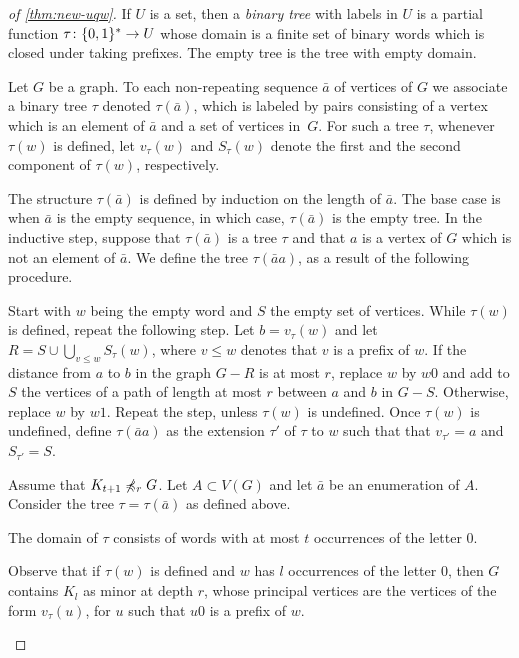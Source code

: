 \begin{proof}[of \cref{thm:new-uqw}]
  If $U$ is a set, then
  a \emph{binary tree}  with labels in $U$
  is a partial function  $\tau\colon \{0,1\}^*\to U$ whose domain is a finite set of binary words which is closed under taking prefixes.
The empty tree is the tree with empty domain.
  
  Let $G$ be a graph. To each non-repeating sequence $\bar a$ of vertices of $G$ we associate a binary tree $\tau$ denoted $\tau(\bar a)$, which is 
  labeled by pairs consisting 
  of a vertex which is an element of $\bar a$ and a set of vertices in~$G$. For such a tree $\tau$, 
  whenever $\tau(w)$ is defined,
   let $v_\tau(w)$ 
  and $S_\tau(w)$ 
  denote the first and the second component of $\tau(w)$, respectively. 
  
  The structure $\tau(\bar a)$ is defined by induction on the length of $\bar a$.  The base case is when $\bar a$ is the empty sequence, in which case,  $\tau(\bar a)$ is the empty tree. In the inductive step, suppose that $\tau(\bar a)$ is a tree $\tau$ and that $a$ is a vertex of $G$ which is not an element of $\bar a$. We  define the tree $\tau(\bar a a)$, as a result of the following procedure.
  
Start with $w$ being the empty word and $S$ the empty set of vertices. While $\tau(w)$ is defined, repeat the following step.
  Let $b=v_\tau(w)$ and let $R=S\cup \bigcup_{v\le w}S_\tau(w)$,
  where $v\le w$ denotes that $v$ is a prefix of $w$.
  If the distance from $a$ to $b$ in the graph 
  $G-R$ is at most $r$, replace $w$ by $w0$ and add to $S$ the vertices of a path of length at most $r$ between $a$ and $b$ in $G-S$. Otherwise, replace $w$ by $w1$.
  Repeat the step, unless $\tau(w)$ is undefined. 
  Once $\tau(w)$ is undefined, define $\tau(\bar aa)$ as the extension $\tau'$ of $\tau$ to $w$    such that that $v_{\tau'}=a$ and $S_{\tau'}=S$.
  
  
  
  Assume that $K_{t+1}\not\preccurlyeq_r G$.   
  Let $A\subset V(G)$ and let $\bar a$ be 
  an enumeration of $A$.
  Consider the tree $\tau=\tau(\bar a)$  as defined above.
\begin{claim}
The domain of $\tau$ consists of words with at most $t$ occurrences of the letter $0$. 
\end{claim}
\begin{clproof}
  Observe that if $\tau(w)$ is defined and $w$ has $l$ occurrences of the letter $0$, then $G$ contains $K_{l}$ as   minor at depth $r$, whose principal vertices are the vertices of the form $v_\tau(u)$, for $u$ such that $u0$ is a prefix of $w$.
\end{clproof}



\end{proof}
